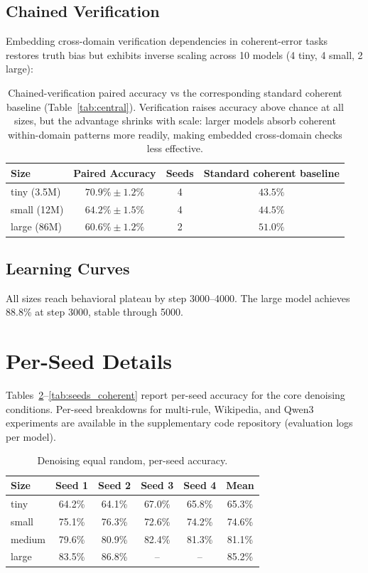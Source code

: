 \documentclass{article}
\begin{document}
\subsection{Chained Verification}
\label{app:chained}

Embedding cross-domain verification dependencies in coherent-error tasks restores truth bias but exhibits inverse scaling across 10 models (4 tiny, 4 small, 2 large):

\begin{table}[h]
\centering
\small
\begin{tabular}{lccc}
\toprule
Size & Paired Accuracy & Seeds & Standard coherent baseline \\
\midrule
tiny (3.5M)  & $70.9\% \pm 1.2\%$ & 4 & $43.5\%$ \\
small (12M)  & $64.2\% \pm 1.5\%$ & 4 & $44.5\%$ \\
large (86M)  & $60.6\% \pm 1.2\%$ & 2 & $51.0\%$ \\
\bottomrule
\end{tabular}
\caption{Chained-verification paired accuracy vs the corresponding standard coherent baseline (Table~\ref{tab:central}). Verification raises accuracy above chance at all sizes, but the advantage shrinks with scale: larger models absorb coherent within-domain patterns more readily, making embedded cross-domain checks less effective.}
\label{tab:chained}
\end{table}

\subsection{Learning Curves}

All sizes reach behavioral plateau by step 3000--4000. The large model achieves 88.8\% at step 3000, stable through 5000.

\section{Per-Seed Details}
\label{app:seeds}

Tables~\ref{tab:seeds_random}--\ref{tab:seeds_coherent} report per-seed accuracy for the core denoising conditions. Per-seed breakdowns for multi-rule, Wikipedia, and Qwen3 experiments are available in the supplementary code repository (evaluation logs per model).

\begin{table}[h]
\centering
\small
\begin{tabular}{lccccc}
\toprule
Size & Seed 1 & Seed 2 & Seed 3 & Seed 4 & Mean \\
\midrule
tiny   & 64.2\% & 64.1\% & 67.0\% & 65.8\% & 65.3\% \\
small  & 75.1\% & 76.3\% & 72.6\% & 74.2\% & 74.6\% \\
medium & 79.6\% & 80.9\% & 82.4\% & 81.3\% & 81.1\% \\
large  & 83.5\% & 86.8\% & --     & --     & 85.2\% \\
\bottomrule
\end{tabular}
\caption{Denoising equal random, per-seed accuracy.}
\label{tab:seeds_random}
\end{table}
\end{document}
